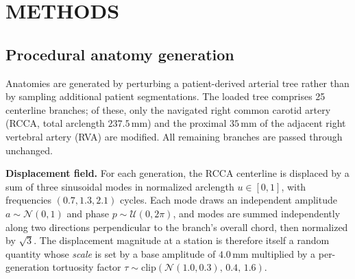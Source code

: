 %
%
%

\section{METHODS}

\subsection{Procedural anatomy generation}

Anatomies are generated by perturbing a patient-derived arterial tree rather than by
sampling additional patient segmentations. The loaded tree comprises 25 centerline
branches; of these, only the navigated right common carotid artery (RCCA, total arclength
$237.5$\,mm) and the proximal $35$\,mm of the adjacent right vertebral artery (RVA) are
modified. All remaining branches are passed through unchanged.

\textbf{Displacement field.} For each generation, the RCCA centerline is displaced by a sum
of three sinusoidal modes in normalized arclength $u \in [0,1]$, with frequencies
$(0.7, 1.3, 2.1)$ cycles. Each mode draws an independent amplitude $a \sim \mathcal{N}(0,1)$
and phase $p \sim \mathcal{U}(0, 2\pi)$, and modes are summed independently along two
directions perpendicular to the branch's overall chord, then normalized by $\sqrt{3}$. The
displacement magnitude at a station is therefore itself a random quantity whose \emph{scale}
is set by a base amplitude of $4.0$\,mm multiplied by a per-generation tortuosity factor
$\tau \sim \mathrm{clip}\!\left(\mathcal{N}(1.0, 0.3),\, 0.4,\, 1.6\right)$.

